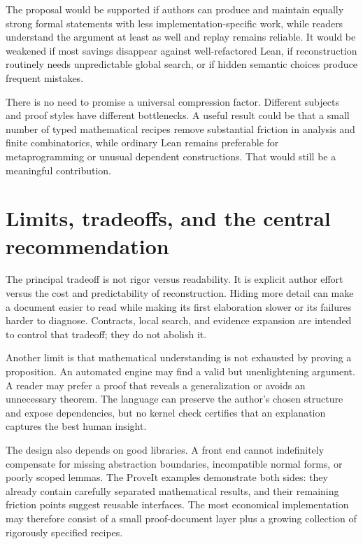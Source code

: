 \documentclass[11pt,letterpaper]{article}
\theoremstyle{remark}
\begin{document}
The proposal would be supported if authors can produce and maintain equally strong formal statements with less implementation-specific work, while readers understand the argument at least as well and replay remains reliable. It would be weakened if most savings disappear against well-refactored Lean, if reconstruction routinely needs unpredictable global search, or if hidden semantic choices produce frequent mistakes.

There is no need to promise a universal compression factor. Different subjects and proof styles have different bottlenecks. A useful result could be that a small number of typed mathematical recipes remove substantial friction in analysis and finite combinatorics, while ordinary Lean remains preferable for metaprogramming or unusual dependent constructions. That would still be a meaningful contribution.

\section{Limits, tradeoffs, and the central recommendation}
\label{sec:conclusion}

The principal tradeoff is not rigor versus readability. It is explicit author effort versus the cost and predictability of reconstruction. Hiding more detail can make a document easier to read while making its first elaboration slower or its failures harder to diagnose. Contracts, local search, and evidence expansion are intended to control that tradeoff; they do not abolish it.

Another limit is that mathematical understanding is not exhausted by proving a proposition. An automated engine may find a valid but unenlightening argument. A reader may prefer a proof that reveals a generalization or avoids an unnecessary theorem. The language can preserve the author's chosen structure and expose dependencies, but no kernel check certifies that an explanation captures the best human insight.

The design also depends on good libraries. A front end cannot indefinitely compensate for missing abstraction boundaries, incompatible normal forms, or poorly scoped lemmas. The ProveIt examples demonstrate both sides: they already contain carefully separated mathematical results, and their remaining friction points suggest reusable interfaces. The most economical implementation may therefore consist of a small proof-document layer plus a growing collection of rigorously specified recipes.
\end{document}
